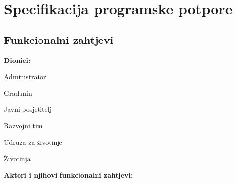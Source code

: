 \chapter{Specifikacija programske potpore}
		
	\section{Funkcionalni zahtjevi}
			
			
			
			\noindent \textbf{Dionici:}
			
			\begin{packed_enum}
				
				\item Administrator
				\item Građanin
				\item Javni posjetitelj
				\item Razvojni tim
				\item Udruga za životinje
				\item Životinja 
				
			\end{packed_enum}
			
			\noindent \textbf{Aktori i njihovi funkcionalni zahtjevi:}
			
